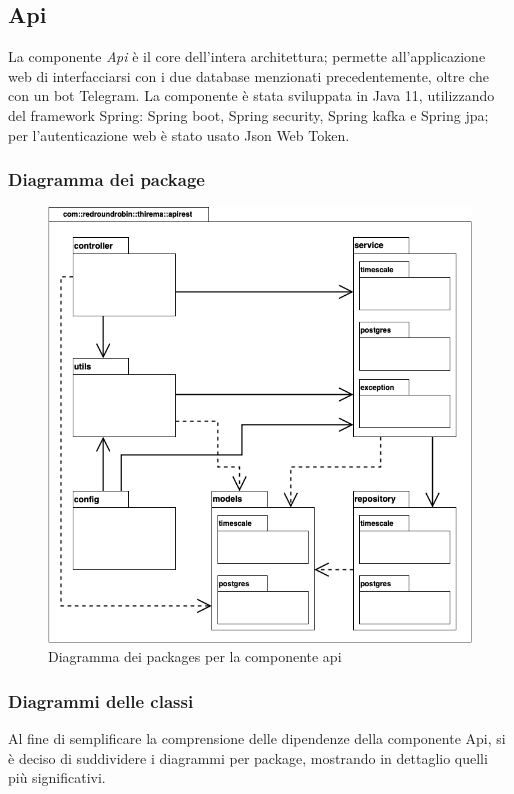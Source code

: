 \subsection{Api}
	La componente \textit{Api} è il core dell'intera architettura; permette all'applicazione web di interfacciarsi con i due database menzionati precedentemente, oltre che con un bot Telegram.
	\newline
	La componente è stata sviluppata in Java 11, utilizzando del framework Spring: Spring boot, Spring security, Spring kafka e Spring jpa; per l'autenticazione web è stato usato Json Web Token.

	\subsubsection{Diagramma dei package}%
		\begin{figure}[H]
			\centering
			\includegraphics[scale=0.500]{res/images/API/packageAPI.png}
			\caption{Diagramma dei packages per la componente api}
			\label{Diagramma 10}
		\end{figure}

	\subsubsection{Diagrammi delle classi}
		Al fine di semplificare la comprensione delle dipendenze della componente Api, si è deciso di suddividere i diagrammi per package, mostrando in dettaglio quelli più significativi.

